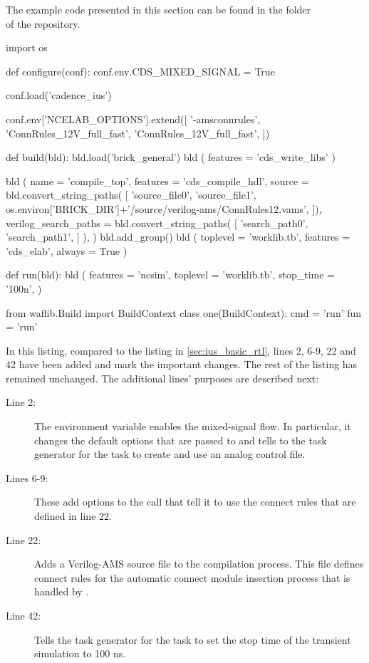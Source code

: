 The example code presented in this section can be found in the folder\\
 of the repository.

\begin{lstwscript}
import os

def configure(conf):
    conf.env.CDS_MIXED_SIGNAL = True

    conf.load('cadence_ius')

    conf.env['NCELAB_OPTIONS'].extend([
        '-amsconnrules', 'ConnRules_12V_full_fast',
        'ConnRules_12V_full_fast',
    ])

def build(bld):
    bld.load('brick_general')
    bld ( features = 'cds_write_libs' )

    bld (
        name = 'compile_top',
        features = 'cds_compile_hdl',
        source = bld.convert_string_paths(
            [
                'source_file0',
                'source_file1',
                os.environ['BRICK_DIR']+'/source/verilog-ams/ConnRules12.vams',
            ]),
        verilog_search_paths = bld.convert_string_paths(
            [
                'search_path0',
                'search_path1',
            ]
        ),
    )
    bld.add_group()
    bld (
        toplevel = 'worklib.tb',
        features = 'cds_elab',
        always = True
    )   

def run(bld):
    bld (
        features = 'ncsim',
        toplevel = 'worklib.tb',
        stop_time = '100n',
    )   

from waflib.Build import BuildContext
class one(BuildContext):
    cmd = 'run'
    fun = 'run'
\end{lstwscript}

In this listing, compared to the listing in \cref{sec:ius_basic_rtl}, lines 2,
6-9, 22 and 42 have been added and mark the important changes. The rest of the
listing has remained unchanged. The additional lines' purposes are described
next:
\begin{description}
    \item[Line 2:] The environment variable  enables the
 mixed-signal flow. In particular, it changes the default options that are
 passed to  and tells to the task generator for the  task
 to create and use an analog control file.
    \item[Lines 6-9:] These add options to the  call that tell it to
 use the connect rules that are defined in line 22.
    \item[Line 22:] Adds a Verilog-AMS source file to the compilation process.
 This file defines connect rules for the automatic connect module insertion
 process that is handled by .
    \item[Line 42:] Tells the task generator for the  task to set the
 stop time of the transient simulation to 100 ns.
\end{description}


